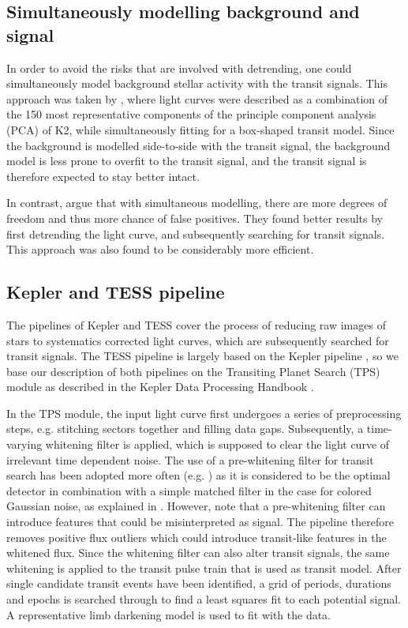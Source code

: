 \subsection{Simultaneously modelling background and signal}

In order to avoid the risks that are involved with detrending, one could simultaneously model background stellar activity with the transit signals. This approach was taken by \cite{foreman2015systematic}, where light curves were described as a combination of the 150 most representative components of the principle component analysis (PCA) of K2, while simultaneously fitting for a box-shaped transit model. Since the background is modelled side-to-side with the transit signal, the background model is less prone to overfit to the transit signal, and the transit signal is therefore expected to stay better intact.

In contrast, \cite{kovacs2016periodic} argue that with simultaneous modelling, there are more degrees of freedom and thus more chance of false positives. They found better results by first detrending the light curve, and subsequently searching for transit signals. This approach was also found to be considerably more efficient.

\subsection{Kepler and TESS pipeline}

The pipelines of Kepler and TESS cover the process of reducing raw images of stars to systematics corrected light curves, which are subsequently searched for transit signals. The TESS pipeline is largely based on the Kepler pipeline \citep{jenkins2016tess}, so we base our description of both pipelines on the Transiting Planet Search (TPS) module as described in the Kepler Data Processing Handbook \cite{jenkins2017kepler}. 

In the TPS module, the input light curve first undergoes a series of preprocessing steps, e.g. stitching sectors together and filling data gaps. Subsequently, a time-varying whitening filter is applied, which is supposed to clear the light curve of irrelevant time dependent noise. The use of a pre-whitening filter for transit search has been adopted more often (e.g. \cite{carpano2003detecting}) as it is considered to be the optimal detector in combination with a simple matched filter in the case for colored Gaussian noise, as explained in \cite{jenkins2002impact}. However, \cite{rodenbeck2018revisiting} note that a pre-whitening filter can introduce features that could be misinterpreted as signal. The pipeline therefore removes positive flux outliers which could introduce transit-like features in the whitened flux. Since the whitening filter can also alter transit signals, the same whitening is applied to the transit pulse train that is used as transit model. After single candidate transit events have been identified, a grid of periods, durations and epochs is searched through to find a least squares fit to each potential signal. A representative limb darkening model is used to fit with the data.

